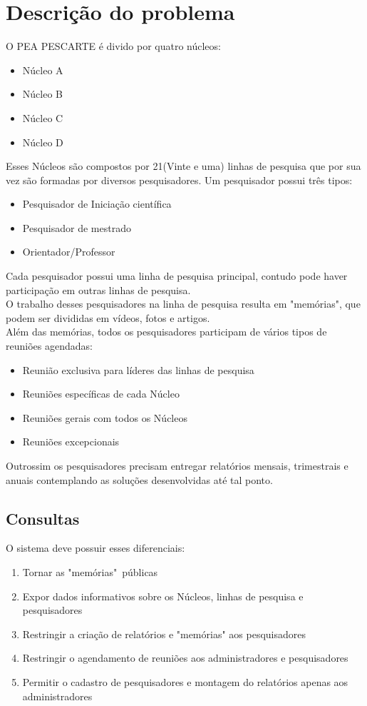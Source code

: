 \documentclass[11pt]{../../classes/ifscarticle}
\begin{document}
\section{Descrição do problema}

O PEA PESCARTE é divido por quatro núcleos:
\begin{itemize}
    \item Núcleo A
    \item Núcleo B
    \item Núcleo C
    \item Núcleo D
\end{itemize}
Esses Núcleos são compostos por 21(Vinte e uma) linhas
de pesquisa que por sua vez são formadas por
diversos pesquisadores. Um pesquisador possui três tipos:
\begin{itemize}
    \item Pesquisador de Iniciação científica
    \item Pesquisador de mestrado
    \item Orientador/Professor
\end{itemize}
Cada pesquisador possui uma linha de pesquisa principal,
contudo pode haver participação em outras linhas de pesquisa.\\
O trabalho desses pesquisadores na linha de pesquisa resulta
em "memórias", que podem ser divididas em vídeos, fotos e artigos.\\
Além das memórias, todos os pesquisadores participam de vários tipos
de reuniões agendadas:
\begin{itemize}
    \item Reunião exclusiva para líderes das linhas de pesquisa
    \item Reuniões específicas de cada Núcleo
    \item Reuniões gerais com todos os Núcleos
    \item Reuniões excepcionais
\end{itemize}
Outrossim os pesquisadores precisam entregar relatórios mensais,
trimestrais e anuais contemplando as soluções desenvolvidas até tal ponto.

\subsection{Consultas}
O sistema deve possuir esses diferenciais:
\begin{enumerate}
    \item Tornar as "memórias"\ públicas
    \item Expor dados informativos sobre os Núcleos, linhas de pesquisa e pesquisadores
    \item Restringir a criação de relatórios e "memórias" aos pesquisadores
    \item Restringir o agendamento de reuniões aos administradores e pesquisadores
    \item Permitir o cadastro de pesquisadores e montagem do relatórios apenas aos administradores
\end{enumerate}
\end{document}
